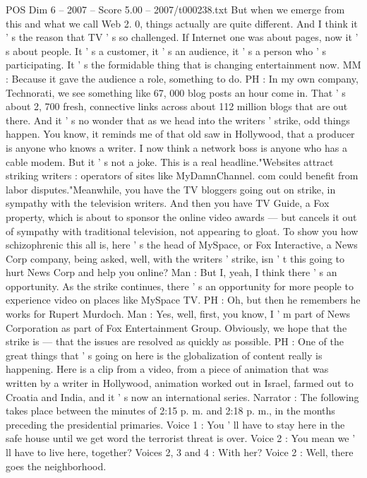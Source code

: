 \begin{textsample}{POS Dim 6 – 2007 – Score 5.00 – 2007/t000238.txt}
But when we emerge from this and what we call Web 2. 0, things actually are quite different.
And I think it ' s the reason that TV ' s so challenged.
If Internet one was about pages, now it ' s about people.
It ' s a customer, it ' s an audience, it ' s a person who ' s participating.
It ' s the formidable thing that is changing entertainment now.
MM : Because it gave the audience a role, something to do.
PH : In my own company, Technorati, we see something like 67, 000 blog posts an hour come in.
That ' s about 2, 700 fresh, connective links across about 112 million blogs that are out there.
And it ' s no wonder that as we head into the writers ' strike, odd things happen.
You know, it reminds me of that old saw in Hollywood, that a producer is anyone who knows a writer.
I now think a network boss is anyone who has a cable modem.
But it ' s not a joke.
This is a real headline."Websites attract striking writers : operators of sites like MyDamnChannel. com could benefit from labor disputes."Meanwhile, you have the TV bloggers going out on strike, in sympathy with the television writers.
And then you have TV Guide, a Fox property, which is about to sponsor the online video awards — but cancels it out of sympathy with traditional television, not appearing to gloat.
To show you how schizophrenic this all is, here ' s the head of MySpace, or Fox Interactive, a News Corp company, being asked, well, with the writers ' strike, isn ' t this going to hurt News Corp and help you online?
Man : But I, yeah, I think there ' s an opportunity.
As the strike continues, there ' s an opportunity for more people to experience video on places like MySpace TV.
PH : Oh, but then he remembers he works for Rupert Murdoch.
Man : Yes, well, first, you know, I ' m part of News Corporation as part of Fox Entertainment Group.
Obviously, we hope that the strike is — that the issues are resolved as quickly as possible.
PH : One of the great things that ' s going on here is the globalization of content really is happening.
Here is a clip from a video, from a piece of animation that was written by a writer in Hollywood, animation worked out in Israel, farmed out to Croatia and India, and it ' s now an international series.
Narrator : The following takes place between the minutes of 2:15 p. m. and 2:18 p. m., in the months preceding the presidential primaries.
Voice 1 : You ' ll have to stay here in the safe house until we get word the terrorist threat is over.
Voice 2 : You mean we ' ll have to live here, together?
Voices 2, 3 and 4 : With her?
Voice 2 : Well, there goes the neighborhood.

\end{textsample}
